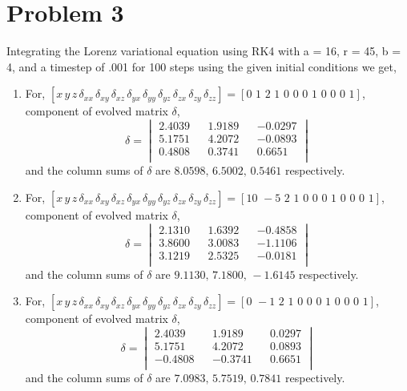 \documentclass{article}
\begin{document}
\section*{Problem 3}
Integrating the Lorenz variational equation using RK4 with a = 16, r = 45, b = 4, and a timestep of .001 for 100 steps using the given initial conditions we get,
\begin{enumerate}[label=(\alph*)]

\item 
For, $
[x \, y \, z \, \delta_{xx} \, \delta_{xy} \, \delta_{xz} \, \delta_{yx} \, \delta_{yy} \, \delta_{yz} \, \delta_{zx} \, \delta_{zy} \, \delta_{zz}] = [0 \,\, 1\,\, 2 \,\,1 \,\,0 \,\,0 \,\,0 \,\,1\,\, 0\,\, 0\,\, 0\,\, 1]
$, component of evolved matrix $\delta$,
$$\delta =
\begin{vmatrix}
2.4039  &&  1.9189 &&  -0.0297 \\
5.1751  &&  4.2072 &&  -0.0893 \\
0.4808  &&  0.3741 &&   0.6651 \\
\end{vmatrix}
$$
and the column sums of $\delta$ are $8.0598,\, 6.5002,\, 0.5461$ respectively.

\item
For, $
[x \, y \, z \, \delta_{xx} \, \delta_{xy} \, \delta_{xz} \, \delta_{yx} \, \delta_{yy} \, \delta_{yz} \, \delta_{zx} \, \delta_{zy} \, \delta_{zz}] = [10 \,\, -5\,\, 2 \,\,1 \,\,0\,\, 0\,\, 0\,\, 1\,\, 0\,\, 0\,\, 0\,\, 1]
$, component of evolved matrix $\delta$,
$$\delta =
\begin{vmatrix}
2.1310  &&   1.6392  && -0.4858 \\
3.8600  &&   3.0083  && -1.1106\\
3.1219  &&   2.5325  && -0.0181\\
\end{vmatrix}
$$
and the column sums of $\delta$ are $9.1130,\, 7.1800,\, -1.6145$ respectively.

\item
For, $
[x \, y \, z \, \delta_{xx} \, \delta_{xy} \, \delta_{xz} \, \delta_{yx} \, \delta_{yy} \, \delta_{yz} \, \delta_{zx} \, \delta_{zy} \, \delta_{zz}] = [0 \,\, -1\,\, 2 \,\,1 \,\,0\,\, 0\,\, 0\,\, 1\,\, 0\,\, 0\,\, 0\,\, 1]
$, component of evolved matrix $\delta$,
$$\delta =
\begin{vmatrix}
 2.4039 &&   1.9189 &&   0.0297\\
 5.1751 &&   4.2072 &&   0.0893\\
-0.4808 &&  -0.3741 &&   0.6651\\
\end{vmatrix}
$$
and the column sums of $\delta$ are $7.0983,\, 5.7519,\, 0.7841$ respectively.


\end{enumerate}
\end{document}
